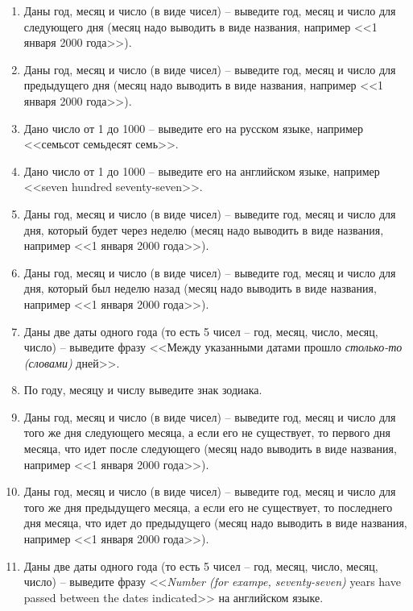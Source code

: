 \begin{enumerate}
\item Даны год, месяц и число (в виде чисел) -- выведите год, месяц и число для следующего дня (месяц надо выводить в виде названия, например <<1 января 2000 года>>).
\item Даны год, месяц и число (в виде чисел) -- выведите год, месяц и число для предыдущего дня (месяц надо выводить в виде названия, например <<1 января 2000 года>>).
\item Дано число от 1 до 1000 -- выведите его на русском языке, например <<семьсот семьдесят семь>>.
\item Дано число от 1 до 1000 -- выведите его на английском языке, например <<seven hundred seventy-seven>>.

\item Даны год, месяц и число (в виде чисел) -- выведите год, месяц и число для дня, который будет через неделю (месяц надо выводить в виде названия, например <<1 января 2000 года>>).
\item Даны год, месяц и число (в виде чисел) -- выведите год, месяц и число для дня, который был неделю назад (месяц надо выводить в виде названия, например <<1 января 2000 года>>).

\item Даны две даты одного года (то есть 5 чисел -- год, месяц, число, месяц, число) -- выведите фразу <<Между указанными датами прошло \textit{столько-то (словами)} дней>>.

\item По году, месяцу и числу выведите знак зодиака.

\item Даны год, месяц и число (в виде чисел) -- выведите год, месяц и число для того же дня следующего месяца, а если его не существует, то первого дня месяца, что идет после следующего (месяц надо выводить в виде названия, например <<1 января 2000 года>>).
\item Даны год, месяц и число (в виде чисел) -- выведите год, месяц и число для того же дня предыдущего месяца, а если его не существует, то последнего дня месяца, что идет до предыдущего (месяц надо выводить в виде названия, например <<1 января 2000 года>>).

\item Даны две даты одного года (то есть 5 чисел -- год, месяц, число, месяц, число) -- выведите фразу <<\textit{Number (for exampe, seventy-seven)} years have passed between the dates indicated>> на английском языке. 



\end{enumerate}



